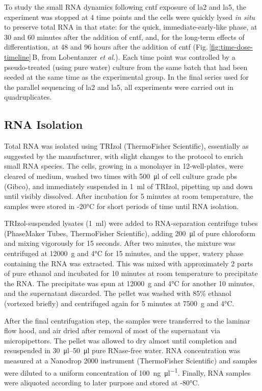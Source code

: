 \begin{method}

To study the small RNA dynamics following \ac{cntf} exposure of \ac{la2} and \ac{la5}, the experiment was stopped at 4 time points and the cells were quickly lysed \textit{in situ} to preserve total RNA in that state: for the quick, immediate-early-like phase, at 30 and 60 minutes after the addition of \ac{cntf}, and, for the long-term effects of differentiation, at 48 and 96 hours after the addition of \ac{cntf} (Fig.\,\ref{fig:time-dose-timeline}\,B, from Lobentanzer \textit{et al.}\cite{Lobentanzer2019a}). Each time point was controlled by a pseudo-treated (using pure water) culture from the same batch that had been seeded at the same time as the experimental group. In the final series used for the parallel sequencing of \ac{la2} and \ac{la5}, all experiments were carried out in quadruplicates. 

\subsection{RNA Isolation}

Total RNA was isolated using TRIzol (ThermoFisher Scientific), essentially as suggested by the manufacturer, with slight changes to the protocol to enrich small RNA species. The cells, growing in a monolayer in 12-well-plates, were cleared of medium, washed two times with \SI{500}{\micro\litre} of cell culture grade \ac{pbs} (Gibco), and immediately suspended in \SI{1}{\milli\litre} of TRIzol, pipetting up and down until visibly dissolved. After incubation for 5 minutes at room temperature, the samples were stored in -20°C for short periods of time until RNA isolation.

TRIzol-suspended lysates (\SI{1}{\milli\litre}) were added to RNA-separation centrifuge tubes (PhaseMaker Tubes, ThermoFisher Scientific), adding \SI{200}{\micro\litre} of pure chloroform and mixing vigorously for 15 seconds. After two minutes, the mixture was centrifuged at \SI{12000}{\g} and 4°C for 15 minutes, and the upper, watery phase containing the RNA was extracted. This was mixed with approximately 2 parts of pure ethanol and incubated for 10 minutes at room temperature to precipitate the RNA. The precipitate was spun at \SI{12000}{\g} and 4°C for another 10 minutes, and the supernatant discarded. The pellet was washed with 85\% ethanol (vortexed briefly) and centrifuged again for 5 minutes at \SI{7500}{\g} and 4°C.

After the final centrifugation step, the samples were transferred to the laminar flow hood, and air dried after removal of most of the supernatant via micropipettors. The pellet was allowed to dry almost until completion and resuspended in \SIrange{30}{50}{\micro\litre} pure RNase-free water. RNA concentration was measured at a Nanodrop 2000 instrument (ThermoFisher Scientific) and samples were diluted to a uniform concentration of \SI{100}{\nano\gram\per\micro\litre}. Finally, RNA samples were aliquoted according to later purpose and stored at -80°C.


\end{method}
